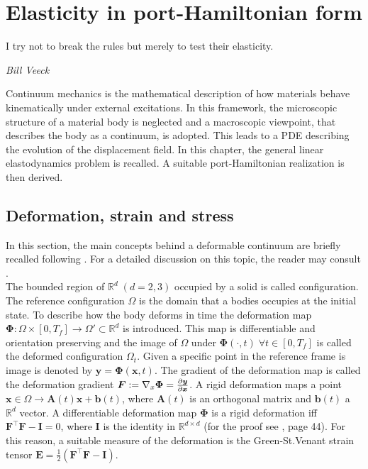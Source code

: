 \chapter{Elasticity in port-Hamiltonian form}

\epigraph{I try not to break the rules but merely to test their elasticity.}{\textit{Bill Veeck}}
\minitoc

Continuum mechanics is the mathematical description of how materials behave kinematically under external excitations. In this framework, the microscopic structure of a material body is neglected and a macroscopic viewpoint, that describes the body as a continuum, is adopted. This leads to a PDE describing the evolution of the displacement field. In this chapter, the general linear elastodynamics problem is recalled. A suitable port-Hamiltonian realization is then derived.

\section{Deformation, strain and stress}
In this section, the main concepts behind a deformable continuum are briefly recalled following \cite{lee2012mixed}. For a detailed discussion on this topic, the reader may consult \cite{abeyaratne2012notes,landau2012elasticity}. \\

The bounded region of $\mathbb{R}^d \; (d=2, 3)$ occupied by a solid is called configuration. The reference configuration $\Omega$ is the domain that a bodies occupies at the initial state. To describe how the body deforms in time the deformation map $\bm\Phi: \Omega \times [0, T_f] \rightarrow \Omega' \subset \mathbb{R}^d$ is introduced. This map is differentiable and orientation preserving and the image of $\Omega$ under $\bm\Phi(\cdot, t) \; \forall t \in [0, T_f]$ is called the deformed configuration $\Omega_t$. Given a specific point in the reference frame is image is denoted by $\bm{y} = \bm{\Phi}(\bm{x}, t)$. The gradient of the deformation map is called the deformation gradient $\bm{F}:=\nabla_x\bm{\Phi} = \diffp{\bm{y}}{\bm{x}}$. A rigid deformation maps a point $\bm{x} \in \Omega \rightarrow \bm{A}(t) \bm{x} + \bm{b}(t)$, where $\bm{A}(t)$ is an orthogonal matrix and $\bm{b}(t)$ a $\mathbb{R}^d$ vector. A differentiable deformation map $\bm\Phi$ is a rigid deformation iff $\bm{F}^\top \bm{F} - \bm{I} = 0$,  where $\bm{I}$ is the identity in $\mathbb{R}^{d\times d}$ (for the proof see \cite{ciarlet1988mathematical}, page 44). For this reason, a suitable measure of the deformation is the Green-St.Venant strain tensor $\bm{E} = \frac{1}{2} (\bm{F}^\top \bm{F} - \bm{I})$.  \\

